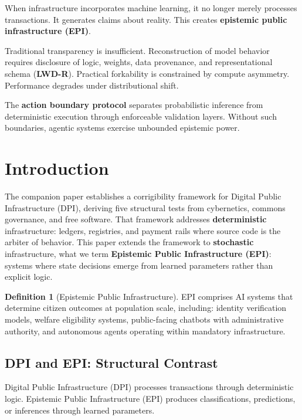 \documentclass[11pt,a4paper]{article}
\theoremstyle{definition}
\newtheorem{definition}{Definition}[section]
\begin{document}
When infrastructure incorporates machine learning, it no longer merely processes transactions. It generates claims about reality. This creates \textbf{epistemic public infrastructure (EPI)}.

Traditional transparency is insufficient. Reconstruction of model behavior requires disclosure of logic, weights, data provenance, and representational schema (\textbf{LWD-R}). Practical forkability is constrained by compute asymmetry. Performance degrades under distributional shift.

The \textbf{action boundary protocol} separates probabilistic inference from deterministic execution through enforceable validation layers. Without such boundaries, agentic systems exercise unbounded epistemic power.

\section{Introduction}
\label{sec:intro}

The companion paper \citep{paper1} establishes a corrigibility framework for Digital Public Infrastructure (DPI), deriving five structural tests from cybernetics, commons governance, and free software. That framework addresses \textbf{deterministic} infrastructure: ledgers, registries, and payment rails where source code is the arbiter of behavior. This paper extends the framework to \textbf{stochastic} infrastructure, what we term \textbf{Epistemic Public Infrastructure (EPI)}: systems where state decisions emerge from learned parameters rather than explicit logic.

\begin{definition}[Epistemic Public Infrastructure]
\label{def:epi}
EPI comprises AI systems that determine citizen outcomes at population scale, including: identity verification models, welfare eligibility systems, public-facing chatbots with administrative authority, and autonomous agents operating within mandatory infrastructure.
\end{definition}

\subsection{DPI and EPI: Structural Contrast}
\label{subsec:dpi-epi-contrast}

Digital Public Infrastructure (DPI) processes transactions through deterministic logic. Epistemic Public Infrastructure (EPI) produces classifications, predictions, or inferences through learned parameters.
\end{document}
